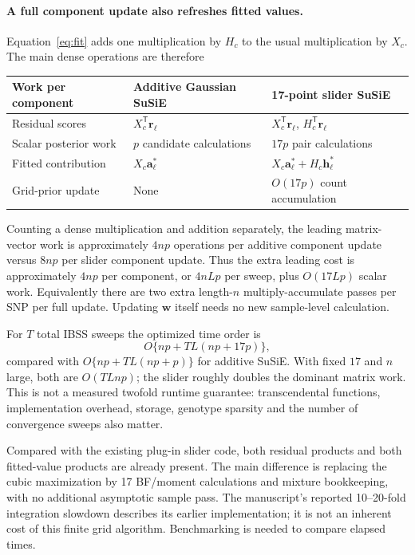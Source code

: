 \documentclass[11pt]{article}
\newcommand{\T}{^{\mathsf T}}
\begin{document}
\paragraph{A full component update also refreshes fitted values.}
Equation~\eqref{eq:fit} adds one multiplication by $H_c$ to the usual
multiplication by $X_c$. The main dense operations are therefore
\begin{center}
\small
\begin{tabular}{@{}p{}p{}p{}@{}}
\toprule
Work per component & Additive Gaussian SuSiE & 17-point slider SuSiE\\
\midrule
Residual scores & $X_c\T\mathbf r_\ell$ &
 $X_c\T\mathbf r_\ell$, $H_c\T\mathbf r_\ell$\\[0.4em]
Scalar posterior work & $p$ candidate calculations & $17p$ pair calculations\\[0.4em]
Fitted contribution & $X_c\mathbf a_\ell^{*}$ &
 $X_c\mathbf a_\ell^{*}+H_c\mathbf h_\ell^{*}$\\[0.4em]
Grid-prior update & None & $O(17p)$ count accumulation\\
\bottomrule
\end{tabular}
\end{center}
Counting a dense multiplication and addition separately, the leading
matrix-vector work is approximately $4np$ operations per additive
component update versus $8np$ per slider component update. Thus the
extra leading cost is approximately $4np$ per component, or $4nLp$
per sweep, plus $O(17Lp)$ scalar work. Equivalently there are two
extra length-$n$ multiply-accumulate passes per SNP per full update.
Updating $\mathbf w$ itself needs no new sample-level calculation.

For $T$ total IBSS sweeps the optimized time order is
\begin{equation}
 O\{np+TL(np+17p)\},
 \label{eq:cost}
\end{equation}
compared with $O\{np+TL(np+p)\}$ for additive SuSiE. With fixed $17$
and $n$ large, both are $O(TLnp)$; the slider roughly doubles the
dominant matrix work. This is not a measured twofold runtime guarantee:
transcendental functions, implementation overhead, storage, genotype
sparsity and the number of convergence sweeps also matter.

Compared with the existing plug-in slider code, both residual products
and both fitted-value products are already present. The main difference
is replacing the cubic maximization by 17 BF/moment calculations and
mixture bookkeeping, with no additional asymptotic sample pass.
The manuscript's reported 10--20-fold integration slowdown describes
its earlier implementation; it is not an inherent cost of this finite
grid algorithm. Benchmarking is needed to compare elapsed times.
\end{document}
